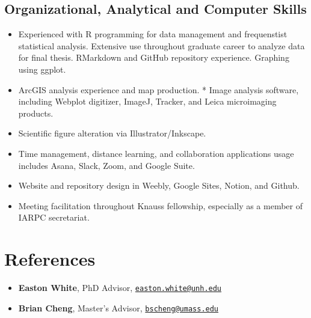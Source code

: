\documentclass[11pt,a4paper,]{awesome-cv}
\providecommand{\tightlist}{%
	\setlength{\itemsep}{0pt}\setlength{\parskip}{0pt}}
\begin{document}
\hypertarget{organizational-analytical-and-computer-skills}{%
\subsection{Organizational, Analytical and Computer
Skills}\label{organizational-analytical-and-computer-skills}}

\begin{itemize}
\tightlist
\item
  Experienced with R programming for data management and frequenstist
  statistical analysis. Extensive use throughout graduate career to
  analyze data for final thesis. RMarkdown and GitHub repository
  experience. Graphing using ggplot.
\item
  ArcGIS analysis experience and map production. * Image analysis
  software, including Webplot digitizer, ImageJ, Tracker, and Leica
  microimaging products.
\item
  Scientific figure alteration via Illustrator/Inkscape.
\item
  Time management, distance learning, and collaboration applications
  usage includes Asana, Slack, Zoom, and Google Suite.
\item
  Website and repository design in Weebly, Google Sites, Notion, and
  Github.
\item
  Meeting facilitation throughout Knauss fellowship, especially as a
  member of IARPC secretariat.
\end{itemize}

\hypertarget{references}{%
\section{References}\label{references}}

\begin{itemize}
\tightlist
\item
  \textbf{Easton White}, PhD Advisor,
  \href{mailto:easton.white@unh.edu}{\nolinkurl{easton.white@unh.edu}}
\item
  \textbf{Brian Cheng}, Master's Advisor,
  \href{mailto:bscheng@umass.edu}{\nolinkurl{bscheng@umass.edu}}
\end{itemize}


\label{LastPage}~
\end{document}
